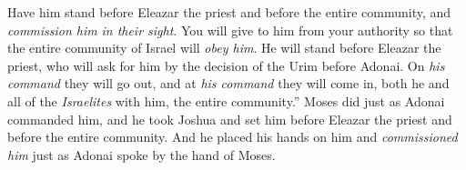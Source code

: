 \begin{biblechapter}
\verse Have him stand before Eleazar the priest and before the entire community, and \textit{commission him} \textit{in their sight}.
\verse You will give to him from your authority so that the entire community of Israel will \textit{obey him}.
\verse He will stand before Eleazar the priest, who will ask for him by the decision of the Urim before Adonai. On \textit{his command} they will go out, and at \textit{his command} they will come in, both he and all of the \textit{Israelites} with him, the entire community.”
\verse Moses did just as Adonai commanded him, and he took Joshua and set him before Eleazar the priest and before the entire community.
\verse And he placed his hands on him and \textit{commissioned him} just as Adonai spoke by the hand of Moses.
\end{biblechapter}

